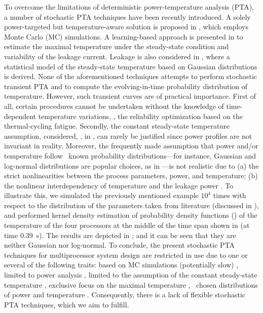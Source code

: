 To overcome the limitations of deterministic power-temperature analysis (PTA), a number of stochastic PTA techniques have been recently introduced.
A solely power-targeted but temperature-aware solution is proposed in \cite{chandra2010}, which employs Monte Carlo (MC) simulations.
A learning-based approach is presented in \cite{juan2011} to estimate the maximal temperature under the steady-state condition and variability of the leakage current.
Leakage is also considered in \cite{juan2012}, where a statistical model of the steady-state temperature based on Gaussian distributions is derived.
None of the aforementioned techniques attempts to perform stochastic transient PTA and to compute the evolving-in-time probability distribution of temperature.
However, such transient curves are of practical importance.
First of all, certain procedures cannot be undertaken without the knowledge of time-dependent temperature variations, \eg, the reliability optimization based on the thermal-cycling fatigue. Secondly, the constant steady-state temperature assumption, considered, \eg, in \cite{juan2011, juan2012}, can rarely be justified since power profiles are not invariant in reality.
Moreover, the frequently made assumption that power and/or temperature follow \apriori\ known probability distributions---for instance, Gaussian and log-normal distributions are popular choices, as in \cite{srivastava2010, juan2012}---is not realistic due to (a) the strict nonlinearities between the process parameters, power, and temperature; (b) the nonlinear interdependency of temperature and the leakage power \cite{liu2007}.
To illustrate this, we simulated the previously mentioned example $10^4$ times with respect to the distribution of the parameters taken from literature (discussed in ), and performed kernel density estimation of probability density functions (\pdfs) of the temperature of the four processors at the middle of the time span shown in  (at time 0.39~s).
The results are depicted in ; and it can be seen that they are neither Gaussian nor log-normal.
To conclude, the present stochastic PTA techniques for multiprocessor system design are restricted in use due to one or several of the following traits: based on MC simulations (potentially slow) \cite{chandra2010}, limited to power analysis \cite{chandra2010}, limited to the assumption of the constant steady-state temperature \cite{juan2011, juan2012}, exclusive focus on the maximal temperature \cite{juan2011}, \apriori\ chosen distributions of power and temperature \cite{srivastava2010, juan2012}.
Consequently, there is a lack of flexible stochastic PTA techniques, which we aim to fulfill.

